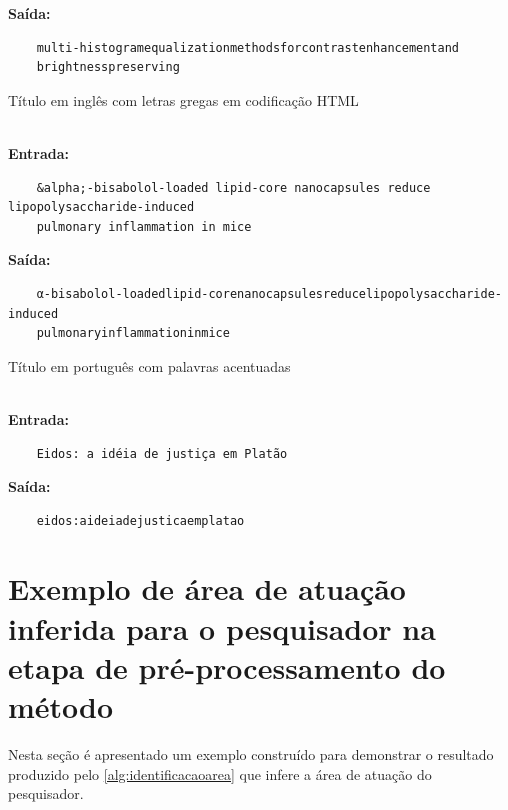 \begin{apendicesenv}
\begin{example}
\begin{ABNTEXfontereduzida}
\noindent \textbf{Saída:}
\begin{verbatim}
    multi-histogramequalizationmethodsforcontrastenhancementand
    brightnesspreserving
\end{verbatim}
\end{ABNTEXfontereduzida}
\end{example}

\begin{example}
Título em inglês com letras gregas em codificação HTML
\begin{ABNTEXfontereduzida}
\\ \noindent \textbf{Entrada:}
\begin{verbatim}
    &alpha;-bisabolol-loaded lipid-core nanocapsules reduce lipopolysaccharide-induced 
    pulmonary inflammation in mice
\end{verbatim}

\noindent \textbf{Saída:}
\begin{verbatim}
    α-bisabolol-loadedlipid-corenanocapsulesreducelipopolysaccharide-induced
    pulmonaryinflammationinmice
\end{verbatim}
\end{ABNTEXfontereduzida}
\end{example}

\begin{example}
Título em português com palavras acentuadas
\begin{ABNTEXfontereduzida}
\\ \noindent \textbf{Entrada:}
\begin{verbatim}
    Eidos: a idéia de justiça em Platão
\end{verbatim}

\noindent \textbf{Saída:}
\begin{verbatim}
    eidos:aideiadejusticaemplatao
\end{verbatim}
\end{ABNTEXfontereduzida}
\end{example}


\chapter{Exemplo de área de atuação inferida para o pesquisador na etapa de pré-processamento do método}

Nesta seção é apresentado um exemplo construído para demonstrar o resultado produzido pelo \autoref{alg:identificacaoarea} que infere a área de atuação do pesquisador.


\end{apendicesenv}
